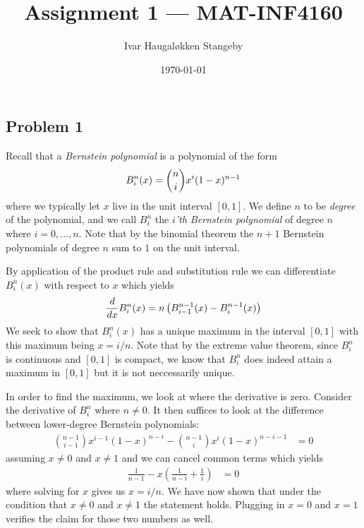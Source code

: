 \documentclass{amsart}
\title{Assignment 1 --- MAT-INF4160}
\author{Ivar Haugal{\o}kken Stangeby}
\date{\today}
\begin{document}
\maketitle

\subsection*{Problem 1} 
\label{par:problem_1}

Recall that a \emph{Bernstein polynomial} is a polynomial of the form
\begin{equation}
	\notag
	B_{i}^{n}(x) = {n \choose i} x^i (1 - x)^{n-1}
\end{equation}
where we typically let $x$ live in the unit interval $\left[ 0, 1 \right]$.
We define $n$ to be \emph{degree} of the polynomial, and we call $B_i^n$ the
\emph{$i$'th Bernstein polynomial} of degree $n$ where $i = 0, \ldots, n$.
Note that by the binomial theorem the $n + 1$ Bernstein polynomials of
degree $n$ sum to $1$ on the unit interval.

By application of the product rule and substitution rule we can
differentiate $B_i^n(x)$ with respect to $x$ which yields
\begin{equation}
	\notag
	\frac{d}{dx}B_i^n(x) = n \left(B_{i-1}^{n-1}(x) - B_{i}^{n-1}(x) \right)
\end{equation}
We seek to show that $B_i^n(x)$ has a unique maximum in the interval $[0,
1]$ with this maximum being $x = i / n$. Note that by the extreme value
theorem, since $B_i^n$ is continuous and $[0, 1]$ is compact, we know that
$B_i^n$ does indeed attain a maximum in $[0, 1]$ but it is not neccessarily
unique.

In order to find the maximum, we look at where the derivative is zero.
Consider the derivative of $B_i^n$ where $n \neq 0$. It then suffices to
look at the difference between lower-degree Bernstein polynomials:
\begin{align*}
	{n-1 \choose i-1}x^{i-1}(1 - x)^{n-i} - {n-1 \choose i}x^i(1-x)^{n-i-1} &= 0
\end{align*}
assuming $x \neq 0$ and $x \neq 1$ and we can cancel
common terms which yields
\begin{align*}
	\frac{1}{n-1} - x \left( \frac{1}{n - i} + \frac{1}{i} \right) &= 0
\end{align*}
where solving for $x$ gives us $x = i / n$. We have now shown that under
the condition that $x \neq 0$ and $x \neq 1$ the statement holds. Plugging
in $x = 0$ and $x = 1$ verifies the claim for those two numbers as well.
\end{document}
